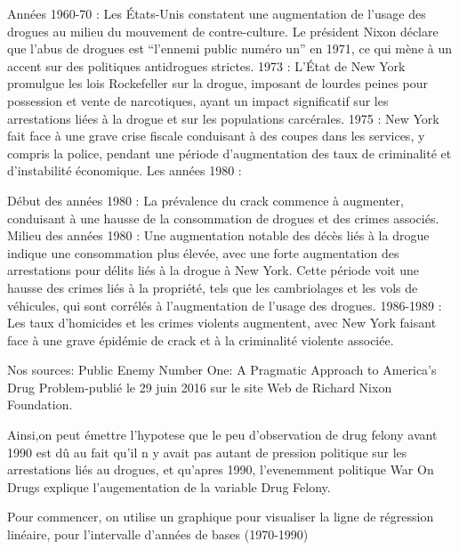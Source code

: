 \documentclass[
]{article}
\begin{document}
Années 1960-70 : Les États-Unis constatent une augmentation de l'usage
des drogues au milieu du mouvement de contre-culture. Le président Nixon
déclare que l'abus de drogues est ``l'ennemi public numéro un'' en 1971,
ce qui mène à un accent sur des politiques antidrogues strictes. 1973 :
L'État de New York promulgue les lois Rockefeller sur la drogue,
imposant de lourdes peines pour possession et vente de narcotiques,
ayant un impact significatif sur les arrestations liées à la drogue et
sur les populations carcérales. 1975 : New York fait face à une grave
crise fiscale conduisant à des coupes dans les services, y compris la
police, pendant une période d'augmentation des taux de criminalité et
d'instabilité économique. Les années 1980 :

Début des années 1980 : La prévalence du crack commence à augmenter,
conduisant à une hausse de la consommation de drogues et des crimes
associés. Milieu des années 1980 : Une augmentation notable des décès
liés à la drogue indique une consommation plus élevée, avec une forte
augmentation des arrestations pour délits liés à la drogue à New York.
Cette période voit une hausse des crimes liés à la propriété, tels que
les cambriolages et les vols de véhicules, qui sont corrélés à
l'augmentation de l'usage des drogues. 1986-1989 : Les taux d'homicides
et les crimes violents augmentent, avec New York faisant face à une
grave épidémie de crack et à la criminalité violente associée.

Nos sources: Public Enemy Number One: A Pragmatic Approach to America's
Drug Problem-publié le 29 juin 2016 sur le site Web de Richard Nixon
Foundation.

Ainsi,on peut émettre l'hypotese que le peu d'observation de drug felony
avant 1990 est dû au fait qu'il n y avait pas autant de pression
politique sur les arrestations liés au drogues, et qu'apres 1990,
l'evenemment politique War On Drugs explique l'augementation de la
variable Drug Felony.

Pour commencer, on utilise un graphique pour visualiser la ligne de
régression linéaire, pour l'intervalle d'années de bases (1970-1990)
\end{document}
